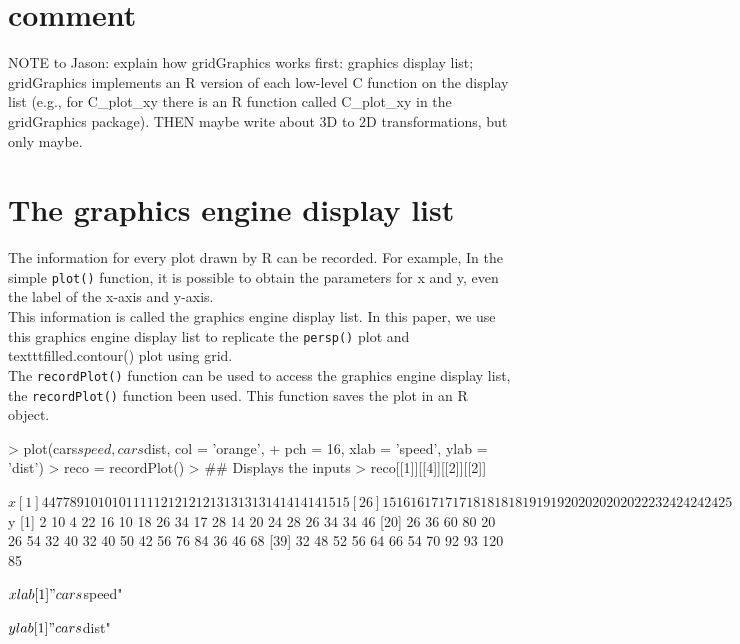 \documentclass[a4paper,10pt]{article}
\begin{document}
\section{comment}
NOTE to Jason: explain how gridGraphics works first: graphics display list; gridGraphics implements an R version of each low-level C function on the display list (e.g., for C\_plot\_xy there is an R function called C\_plot\_xy in the gridGraphics package). THEN maybe write about 3D to 2D transformations, but only maybe.


\section{The graphics engine display list}
The information for every plot drawn by R can be recorded. For example, In the simple \texttt{plot()} function, it is possible to obtain the parameters for x and y, even the label of the x-axis and y-axis.\\
This information is called the graphics engine display list. In this paper, we use this graphics engine display list to replicate the \texttt{persp()} plot and texttt{filled.contour()} plot using grid.\\

The \texttt{recordPlot()} function can be used to access the graphics engine display list, the \texttt{recordPlot()} function been used. This function saves the plot in an R object. 


\begin{Schunk}
\begin{Sinput}
> plot(cars$speed, cars$dist, col = 'orange', 
+       pch = 16, xlab = 'speed', ylab = 'dist')
> reco = recordPlot()
> ## Displays the inputs 
> reco[[1]][[4]][[2]][[2]]
\end{Sinput}
\begin{Soutput}
$x
 [1]  4  4  7  7  8  9 10 10 10 11 11 12 12 12 12 13 13 13 13 14 14 14 14 15 15
[26] 15 16 16 17 17 17 18 18 18 18 19 19 19 20 20 20 20 20 22 23 24 24 24 24 25

$y
 [1]   2  10   4  22  16  10  18  26  34  17  28  14  20  24  28  26  34  34  46
[20]  26  36  60  80  20  26  54  32  40  32  40  50  42  56  76  84  36  46  68
[39]  32  48  52  56  64  66  54  70  92  93 120  85

$xlab
[1] "cars$speed"

$ylab
[1] "cars$dist"
\end{Soutput}
\end{Schunk}
\end{document}

